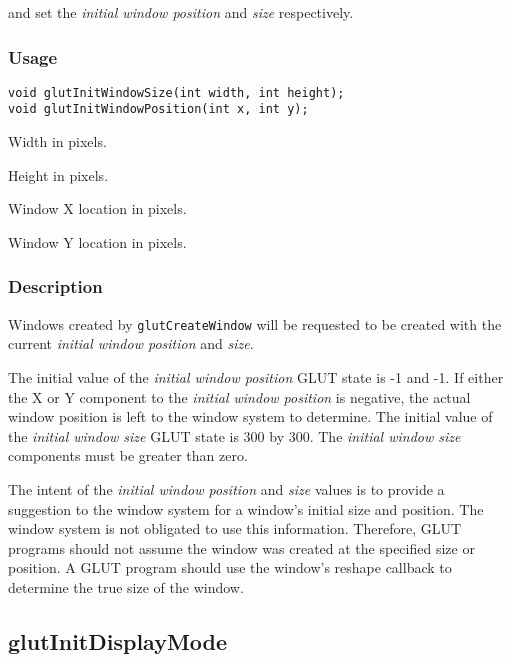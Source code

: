  and  set the
{\em initial window position} and {\em size} respectively.

\subsubsection*{Usage}

\begin{verbatim}
void glutInitWindowSize(int width, int height);
void glutInitWindowPosition(int x, int y);
\end{verbatim}
\begin{description}
\itemsep 0in
\item[{\tt width}]
Width in pixels.
\item[{\tt height}]
Height in pixels.
\item[{\tt x}]
Window X location in pixels.
\item[{\tt y}]
Window Y location in pixels.
\end{description}

\subsubsection*{Description}

Windows created by {\tt glutCreateWindow} will be requested to be created
with the current {\em initial window position} and {\em size}.

The initial value of the {\em initial window position} GLUT state is
-1 and -1.  If either the X or Y component to the {\em initial
window position} is negative, the actual window position is left
to the window system to determine.
The initial value of the {\em initial window size} GLUT state is 300 by 300.
The {\em initial window size} components must be greater than zero.

The intent of the {\em initial window position} and {\em size} values is
to provide a suggestion to the window system for a window's initial size
and position.  The window system is not obligated to use this information.
Therefore, GLUT programs should not assume the window was created at the
specified size or position.  A GLUT program should use the window's
reshape callback to determine the true size of the window.

\subsection{glutInitDisplayMode}


